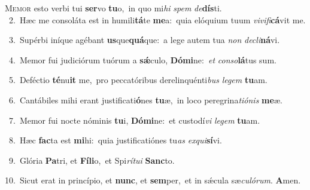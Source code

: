 \lettrine{\initial\textcolor{\initialcolor}{M}}{emor} esto verbi tui \textbf{ser}\-vo \textbf{tu}\-o,~\star in quo mi\textit{hi} \textit{spem} \textit{de}\-\textbf{dís}ti.\\
{\numbfont\textcolor{\numbcolor}{~2.}}~Hæc me consoláta est in humili\-\textbf{tá}\-te \textbf{me}\-a:~\star quia elóquium tuum \textit{vi}\-\textit{vi}\textit{fi}\textbf{cá}vit me.\par
{\numbfont\textcolor{\numbcolor}{~3.}}~Supérbi iníque agébant \textbf{us}\-que\-\textbf{quá}\-que:~\star a lege autem tua \textit{non} \textit{de}\-\textit{cli}\textbf{ná}vi.\par
{\numbfont\textcolor{\numbcolor}{~4.}}~Memor fui judiciórum tuórum a \textbf{sǽ}\-culo, \textbf{Dó}\-\textbf{mi}ne:~\star \textit{et} \textit{con}\-\textit{so}\textbf{lá}tus sum.\par
{\numbfont\textcolor{\numbcolor}{~5.}}~Deféctio \textbf{té}\-nu\textbf{it} me,~\star pro peccatóribus derelinquénti\textit{bus} \textit{le}\-\textit{gem} \textbf{tu}\-am.\par
{\numbfont\textcolor{\numbcolor}{~6.}}~Cantábiles mihi erant justificati\-\textbf{ó}\-nes \textbf{tu}\-æ,~\star in loco peregrina\-\textit{ti}\-\textit{ó}\textit{nis} \textbf{me}\-æ.\par
{\numbfont\textcolor{\numbcolor}{~7.}}~Memor fui nocte nóminis \textbf{tu}\-i, \textbf{Dó}\-\textbf{mi}ne:~\star et custodí\textit{vi} \textit{le}\-\textit{gem} \textbf{tu}\-am.\par
{\numbfont\textcolor{\numbcolor}{~8.}}~Hæc \textbf{fac}\-ta est \textbf{mi}\-hi:~\star quia justificatiónes tu\textit{as} \textit{ex}\-\textit{qui}\textbf{sí}vi.\par
{\numbfont\textcolor{\numbcolor}{~9.}}~Glória \textbf{Pa}\-tri, et \textbf{Fí}\-\textbf{li}o,~\star et Spi\-\textit{rí}\-\textit{tu}\textit{i} \textbf{Sanc}\-to.\par
{\numbfont\textcolor{\numbcolor}{10.}}~Sicut erat in princípio, et \textbf{nunc}\-, et \textbf{sem}\-per,~\star et in sǽcula sæ\-\textit{cu}\-\textit{ló}\textit{rum}. \textbf{A}\-men.\par
